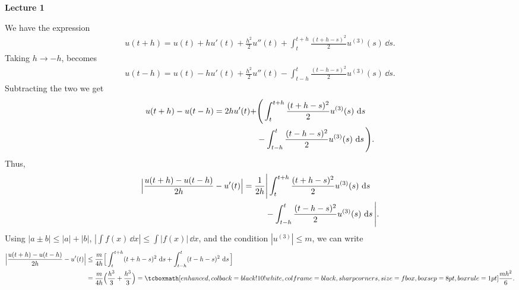 \def\duedate{08/31/2022}
\def\HWnum{1}



    
\textbf{\large Lecture 1}


We have the expression
\begin{eqnarray}
    \label{eq:u(t+h)}
    u(t+h) = u(t) + hu'(t) + \frac{h^2}{2}u''(t) + \int_{t}^{t+h} \frac{(t+h-s)^{2}}{2} u^{(3)}(s)\,\dd{s}
.\end{eqnarray}
Taking $h \rightarrow -h$,  becomes
\begin{eqnarray}
    \label{eq:u(t-h)}
    u(t-h) = u(t) - hu'(t) + \frac{h^2}{2}u''(t) - \int_{t-h}^{t} \frac{(t-h-s)^{2}}{2} u^{(3)}(s)\,\dd{s}
.\end{eqnarray}
Subtracting the two we get
\begin{align}
    \label{eq:subtract}
    u(t+h) - u(t-h) = 2hu'(t) + &\Bigg( \int_{t}^{t+h} \frac{(t+h-s)^{2}}{2} u^{(3)}(s)\,\dd{s} \notag \\
                                &- \int_{t-h}^{t} \frac{(t-h-s)^{2}}{2} u^{(3)}(s)\,\dd{s} \Bigg)
.\end{align}
Thus,
\begin{align}
    \label{eq:abs-value-expr}
    \Big| \frac{u(t+h) - u(t-h)}{2h} - u'(t) \Big| = \frac{1}{2h}&\Bigg| \int_{t}^{t+h} \frac{(t+h-s)^{2}}{2} u^{(3)}(s)\,\dd{s} \notag \\
    &- \int_{t-h}^{t} \frac{(t-h-s)^{2}}{2} u^{(3)}(s)\,\dd{s} \Bigg|
.\end{align}
Using $|a \pm b| \leq |a| + |b|$, $|\int f(x) \, \dd{x}| \leq \int |f(x)|\,\dd{x}$, and the condition $|u^{(3)}| \leq m$, we can write
\begin{align}
    \Big| \frac{u(t+h) - u(t-h)}{2h} - u'(t) \Big| &\leq \frac{m}{4h}\Big[\int_{t}^{t+h} (t+h-s)^{2}\, \dd{s} + \int_{t-h}^{t} (t-h-s)^2\, \dd{s} \Big] \notag \\
                                                   &= \frac{m}{4h}\Big( \frac{h^3}{3} + \frac{h^3}{3} \Big) = \eqbox{\frac{mh^2}{6}}
.\end{align}


